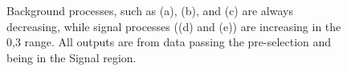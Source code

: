 \begin{figure}
    \myfloatalign
    \\
     \\
    \caption[Angular distributions]{Background processes, such as (a), (b), and (c) are always decreasing, while signal processes ((d) and (e)) are increasing in the 0,3 range. All outputs are from data passing the pre-selection and being in the Signal region. }\label{fig:DNNout}
\end{figure}

